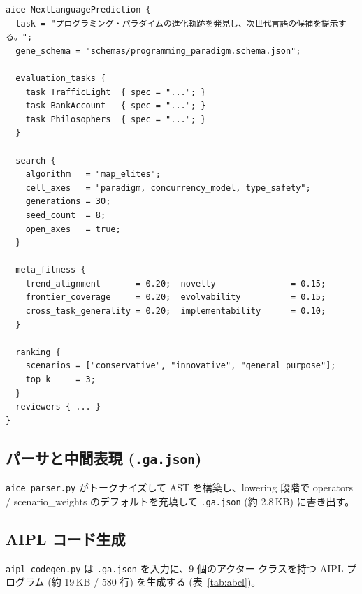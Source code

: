 \documentclass[a4paper,11pt]{article}
\begin{document}
\begin{lstlisting}[language=aice,caption={\texttt{examples/NextLanguagePrediction.aice} (抜粋)},label=lst:aice]
aice NextLanguagePrediction {
  task = "プログラミング・パラダイムの進化軌跡を発見し、次世代言語の候補を提示する。";
  gene_schema = "schemas/programming_paradigm.schema.json";

  evaluation_tasks {
    task TrafficLight  { spec = "..."; }
    task BankAccount   { spec = "..."; }
    task Philosophers  { spec = "..."; }
  }

  search {
    algorithm   = "map_elites";
    cell_axes   = "paradigm, concurrency_model, type_safety";
    generations = 30;
    seed_count  = 8;
    open_axes   = true;
  }

  meta_fitness {
    trend_alignment       = 0.20;  novelty               = 0.15;
    frontier_coverage     = 0.20;  evolvability          = 0.15;
    cross_task_generality = 0.20;  implementability      = 0.10;
  }

  ranking {
    scenarios = ["conservative", "innovative", "general_purpose"];
    top_k     = 3;
  }
  reviewers { ... }
}
\end{lstlisting}

\subsection{パーサと中間表現 (\texttt{.ga.json})}

\texttt{aice\_parser.py} がトークナイズして AST を構築し、lowering 段階で
operators / scenario\_weights のデフォルトを充填して
\texttt{.ga.json} (約 2.8\,KB) に書き出す。

\subsection{AIPL コード生成}

\texttt{aipl\_codegen.py} は \texttt{.ga.json} を入力に、9 個のアクター
クラスを持つ AIPL プログラム (約 19\,KB / 580 行) を生成する
(表~\ref{tab:abcl})。
\end{document}
